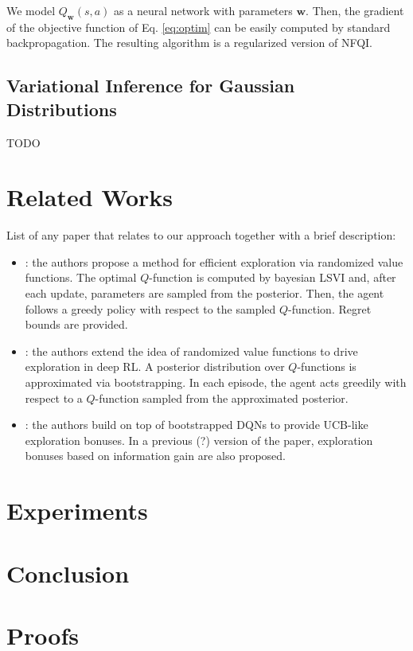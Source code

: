 \documentclass{article}
\begin{document}
We model $Q_{\bm{w}}(s,a)$ as a neural network with parameters $\bm{w}$. Then, the gradient of the objective function of Eq. \eqref{eq:optim} can be easily computed by standard backpropagation. The resulting algorithm is a regularized version of NFQI.

\subsection{Variational Inference for Gaussian Distributions}

TODO

\section{Related Works}

List of any paper that relates to our approach together with a brief description:
\begin{itemize}
\item \cite{osband2014generalization}: the authors propose a method for efficient exploration via randomized value functions. The optimal $Q$-function is computed by bayesian LSVI and, after each update, parameters are sampled from the posterior. Then, the agent follows a greedy policy with respect to the sampled $Q$-function. Regret bounds are provided.
\item \cite{osband2016deep}: the authors extend the idea of randomized value functions to drive exploration in deep RL. A posterior distribution over $Q$-functions is approximated via bootstrapping. In each episode, the agent acts greedily with respect to a $Q$-function sampled from the approximated posterior.
\item \cite{chen2017ucb}: the authors build on top of bootstrapped DQNs to provide UCB-like exploration bonuses. In a previous (?) version of the paper, exploration bonuses based on information gain are also proposed.
\end{itemize}

\section{Experiments}

\section{Conclusion}

{\small 


}
\newpage
\appendix

\section{Proofs}
\end{document}
